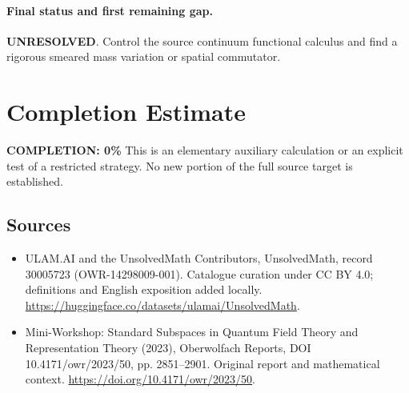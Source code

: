 \documentclass[11pt]{article}
\begin{document}
\paragraph{Final status and first remaining gap.}
\textbf{UNRESOLVED}. Control the source continuum functional calculus and find a rigorous smeared mass variation or spatial commutator.

\section{Completion Estimate}
\noindent\textbf{COMPLETION: 0\%}
This is an elementary auxiliary calculation or an explicit test of a restricted strategy. No new portion of the full source target is established.

\subsection{Sources}
\begin{itemize}
\item[\hypertarget{source:30005723:1}{S1}] ULAM.AI and the UnsolvedMath Contributors, UnsolvedMath, record 30005723 (OWR-14298009-001). Catalogue curation under CC BY 4.0; definitions and English exposition added locally.
\url{https://huggingface.co/datasets/ulamai/UnsolvedMath}.
\item[\hypertarget{source:30005723:2}{S2}] Mini-Workshop: Standard Subspaces in Quantum Field Theory and Representation Theory (2023), Oberwolfach Reports, DOI 10.4171/owr/2023/50, pp. 2851--2901. Original report and mathematical context.
\url{https://doi.org/10.4171/owr/2023/50}.
\end{itemize}
\label{end:30005723}
\end{document}
